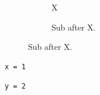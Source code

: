 \documentclass{article}
\begin{document}
\begin{figure}\begin{subfigure}{.4\textwidth}X\caption{Sub after X.}\end{subfigure}\end{figure}
\begin{lstlisting}[caption={Listing cap.}]
x = 1
\end{lstlisting}
\begin{lstlisting}[caption={Second listing.}]
y = 2
\end{lstlisting}
\end{document}
